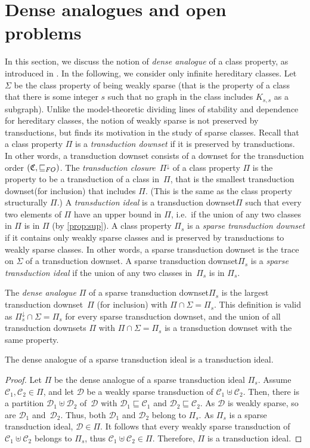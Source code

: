 \documentclass{lmcs}
\newcommand{\Cc}{\mathscr{C}}
\newcommand{\Dd}{\mathscr{D}}
\renewcommand{\FO}{{\rm FO}}
\theoremstyle{definition}
\DeclareMathOperator{\union}{\uplus}
\newcommand{\dset}{downset\xspace}
\begin{document}
\section{Dense analogues and open problems}
\label{sec:analogue}
In this section, we discuss the notion of \emph{dense analogue} of a class property, as introduced in \cite{gajarsky2022stable}.
In the following, we consider only infinite hereditary classes.
Let $\Sigma$
 be the class property of being weakly sparse (that is the property of a class that there is some integer $s$ such that no graph in the class includes $K_{s,s}$ as a subgraph).
Unlike the model-theoretic dividing lines of stability and dependence for hereditary classes, the notion of weakly sparse  is not preserved by transductions, but finds its motivation in the study of sparse classes.
Recall that a class property $\Pi$ is a \emph{transduction \dset} if it is preserved by transductions. 
In other words, a transduction \dset consists of a \dset for the transduction order $(\mathfrak C,\sqsubseteq_\FO)$.  
The \emph{transduction closure}~$\Pi^{\downarrow}$ of a class property $\Pi$ is the property 
to be a transduction of a class in~$\Pi$, that is the smallest transduction \dset (for inclusion) that includes $\Pi$. (This is the same as the class property structurally $\Pi$.)
A \emph{transduction ideal} is a transduction \dset $\Pi$ such that every two elements of $\Pi$ have an upper bound in $\Pi$, i.e.\ if the union of any two classes in $\Pi$ is in $\Pi$ (by \cref{prop:sup}).  
A class property $\Pi_s$ is a \emph{sparse transduction \dset} if it contains only weakly sparse classes and is preserved by transductions to weakly sparse classes. In other words, a sparse transduction \dset is the trace on $\Sigma$ of a transduction \dset. A sparse transduction \dset $\Pi_s$ is a \emph{sparse transduction ideal} if the union of any two classes in~$\Pi_s$ is in $\Pi_s$.


The \emph{dense analogue}  $\Pi$ of a sparse transduction \dset $\Pi_s$ is the largest transduction \dset~$\Pi$ (for inclusion) with $\Pi\cap\Sigma=\Pi_s$.  This definition is valid as $\Pi_s^{\downarrow}\cap\Sigma=\Pi_s$ for every sparse transduction \dset, and the union of all transduction {\dset}s $\Pi$ with
$\Pi\cap\Sigma=\Pi_s$ is a transduction \dset with the same property.

\begin{prop}
	The dense analogue of a sparse transduction ideal is a transduction ideal.
\end{prop}
\begin{proof}
	Let $\Pi$ be the dense analogue of a sparse transduction ideal $\Pi_s$.
	Assume $\Cc_1,\Cc_2\in\Pi$, and let $\Dd$ be a weakly sparse transduction of $\Cc_1\union\Cc_2$. Then, 
	there is a partition $\Dd_1\union\Dd_2$ of~$\Dd$ with $\Dd_1\sqsubseteq\Cc_1$ and $\Dd_2\sqsubseteq\Cc_2$. As $\Dd$ is weakly sparse, so are $\Dd_1$ and~$\Dd_2$. Thus, both $\Dd_1$ and $\Dd_2$ belong to $\Pi_s$. As $\Pi_s$ is a sparse transduction ideal, $\Dd\in\Pi$. It follows that every weakly sparse transduction of $\Cc_1\union\Cc_2$ belongs to $\Pi_s$, thus $\Cc_1\union\Cc_2\in\Pi$.
	Therefore, $\Pi$ is a transduction ideal.
\end{proof}
\end{document}
